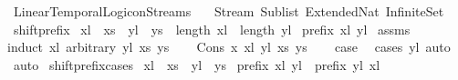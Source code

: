 %
\begin{isabellebody}%
%
%
\isadelimdocument
%
\endisadelimdocument
%
\isatagdocument
%
\isamarkuptrue%
%
\endisatagdocument
{\isafolddocument}%
%
\isadelimdocument
%
\endisadelimdocument
%
\isadelimtheory
%
\endisadelimtheory
%
\isatagtheory
{}\isamarkupfalse%
\ Linear{\isacharunderscore}Temporal{\isacharunderscore}Logic{\isacharunderscore}on{\isacharunderscore}Streams\isanewline
\ \ \ Stream\ Sublist\ Extended{\isacharunderscore}Nat\ Infinite{\isacharunderscore}Set\isanewline
{}%
\endisatagtheory
{\isafoldtheory}%
%
\isadelimtheory
%
\endisadelimtheory
%
\isadelimdocument
%
\endisadelimdocument
%
\isatagdocument
%
\isamarkuptrue%
%
\endisatagdocument
{\isafolddocument}%
%
\isadelimdocument
%
\endisadelimdocument
{}\isamarkupfalse%
\ shift{\isacharunderscore}prefix{\isacharcolon}\isanewline
{}\ {\isachardoublequoteopen}xl\ {\isacharat}{\isacharminus}\ xs\ {\isacharequal}\ yl\ {\isacharat}{\isacharminus}\ ys{\isachardoublequoteclose}\ \ {\isachardoublequoteopen}length\ xl\ {\isasymle}\ length\ yl{\isachardoublequoteclose}\isanewline
{}\ {\isachardoublequoteopen}prefix\ xl\ yl{\isachardoublequoteclose}\isanewline
%
\isadelimproof
%
\endisadelimproof
%
\isatagproof
{}\isamarkupfalse%
\ assms\ \isamarkupfalse%
{\isacharparenleft}induct\ xl\ arbitrary{\isacharcolon}\ yl\ xs\ ys{\isacharparenright}\isanewline
\ \ \isamarkupfalse%
\ {\isacharparenleft}Cons\ x\ xl\ yl\ xs\ ys{\isacharparenright}\isanewline
\ \ \isamarkupfalse%
\ {\isacharquery}case\ \isamarkupfalse%
\ {\isacharparenleft}cases\ yl{\isacharparenright}\ auto\isanewline
{}\isamarkupfalse%
\ auto%
\endisatagproof
{\isafoldproof}%
%
\isadelimproof
\isanewline
%
\endisadelimproof
\isanewline
{}\isamarkupfalse%
\ shift{\isacharunderscore}prefix{\isacharunderscore}cases{\isacharcolon}\isanewline
{}\ {\isachardoublequoteopen}xl\ {\isacharat}{\isacharminus}\ xs\ {\isacharequal}\ yl\ {\isacharat}{\isacharminus}\ ys{\isachardoublequoteclose}\isanewline
{}\ {\isachardoublequoteopen}prefix\ xl\ yl\ {\isasymor}\ prefix\ yl\ xl{\isachardoublequoteclose}\isanewline
%
\isadelimproof
%
\endisadelimproof

\end{isabellebody}
